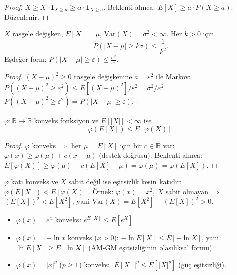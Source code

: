 \begin{proof}
$X \geq X \cdot \mathbf{1}_{X \geq a} \geq a \cdot \mathbf{1}_{X \geq a}$.
Beklenti alınca: $E[X] \geq a \cdot P(X \geq a)$. Düzenlenir.
\end{proof}

\begin{teorem}
\label{thm:chebyshev}
$X$ rasgele değişken, $E[X] = \mu$, $\mathrm{Var}(X) = \sigma^2 < \infty$. Her $k > 0$ için
\[
  P(|X - \mu| \geq k\sigma) \leq \frac{1}{k^2}.
\]
Eşdeğer form: $P(|X - \mu| \geq \varepsilon) \leq \frac{\sigma^2}{\varepsilon^2}$.
\end{teorem}

\begin{proof}
$(X-\mu)^2 \geq 0$ rasgele değişkenine $a = \varepsilon^2$ ile Markov:
$P((X-\mu)^2 \geq \varepsilon^2) \leq E[(X-\mu)^2]/\varepsilon^2 = \sigma^2/\varepsilon^2$.
$P((X-\mu)^2 \geq \varepsilon^2) = P(|X-\mu| \geq \varepsilon)$.
\end{proof}

\begin{teorem}
\label{thm:jensen}
$\varphi : \mathbb{R} \to \mathbb{R}$ konveks fonksiyon ve $E[|X|] < \infty$ ise
\[
  \varphi(E[X]) \leq E[\varphi(X)].
\]
\end{teorem}

\begin{proof}
$\varphi$ konveks $\Rightarrow$ her $\mu = E[X]$ için bir $c \in \mathbb{R}$ var:
$\varphi(x) \geq \varphi(\mu) + c(x - \mu)$ (destek doğrusu).
Beklenti alınca: $E[\varphi(X)] \geq \varphi(\mu) + c(E[X] - \mu) = \varphi(\mu) = \varphi(E[X])$.
\end{proof}

\begin{karsiornek}
$\varphi$ katı konveks ve $X$ sabit değil ise eşitsizlik kesin katıdır:
$\varphi(E[X]) < E[\varphi(X)]$.
Örnek: $\varphi(x) = x^2$, $X$ sabit olmayan $\Rightarrow$ $(E[X])^2 < E[X^2]$,
yani $\mathrm{Var}(X) = E[X^2] - (E[X])^2 > 0$.
\end{karsiornek}

\begin{ornek}
\begin{itemize}
  \item $\varphi(x) = e^x$ konveks: $e^{E[X]} \leq E[e^X]$.
  \item $\varphi(x) = -\ln x$ konveks ($x>0$): $-\ln E[X] \leq E[-\ln X]$,
        yani $\ln E[X] \geq E[\ln X]$ (AM-GM eşitsizliğinin olasılıksal formu).
  \item $\varphi(x) = |x|^p$ ($p \geq 1$) konveks: $|E[X]|^p \leq E[|X|^p]$ (güç eşitsizliği).
\end{itemize}
\end{ornek}

